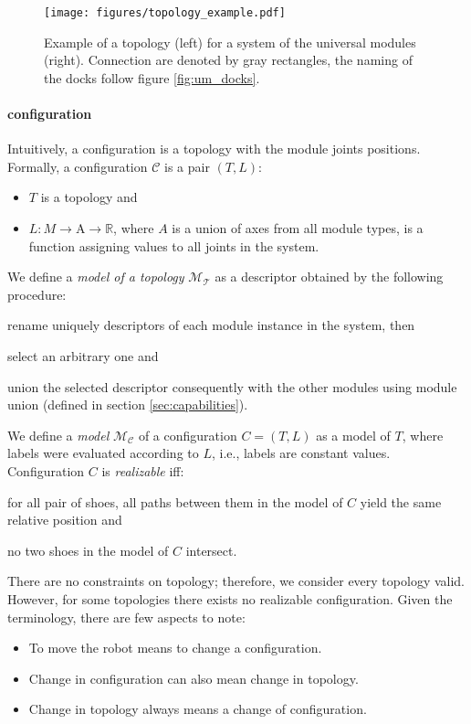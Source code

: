 \begin{figure}[t]
    \centering
    \texttt{[image: figures/topology\_example.pdf]}
    \caption{Example of a topology (left) for a system of the universal modules
    (right). Connection are denoted by gray rectangles, the naming of the docks
    follow figure \ref{fig:um_docks}. }
    \label{fig:topology_example}
\end{figure}

\paragraph{configuration} Intuitively, a configuration is a topology with the
 module joints positions. Formally, a configuration $\mathcal{C}$ is a pair $(T,
 L)$:
 \begin{itemize}
    \item $T$ is a topology and
    \item $L: M \rightarrow \text{A} \rightarrow \mathds{R}$, where $A$ is a
    union of axes from all module types, is a function assigning values to all
    joints in the system.
 \end{itemize}

We define a \emph{model of a topology} $\mathcal{M}_\mathcal{T}$ as a descriptor
obtained by the following procedure:
\begin{enumerate*}
    \item rename uniquely descriptors of each module instance in the system, then
    \item select an arbitrary one and
    \item union the selected descriptor consequently with the other modules
    using module union (defined in section \ref{sec:capabilities}).
\end{enumerate*}
We define a \emph{model} $\mathcal{M}_\mathcal{C}$ of a configuration
$C=(T, L)$ as a model of $T$, where labels were evaluated according to $L$,
i.e., labels are constant values. Configuration $C$ is \emph{realizable} iff:
\begin{enumerate*}
    \item for all pair of shoes, all paths between them in the model of $C$
    yield the same relative position and
    \item no two shoes in the model of $C$ intersect.
\end{enumerate*}

There are no constraints on topology; therefore, we consider every topology
valid. However, for some topologies there exists no realizable configuration.
Given the terminology, there are few aspects to note:
\begin{itemize}
    \item To move the robot means to change a configuration.
    \item Change in configuration can also mean change in topology.
    \item Change in topology always means a change of configuration.
\end{itemize}

